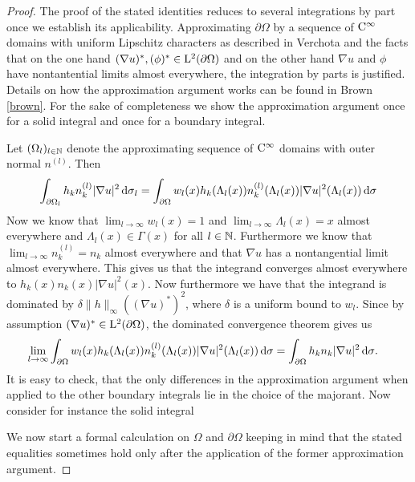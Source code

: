 \begin{proof}
  The proof of the stated identities reduces to several integrations by part  once we establish its applicability. 
  Approximating $\partial \Omega$ by a sequence of $\mathrm{C}^\infty$ domains with uniform Lipschitz characters as described in Verchota \cite{verchotaDiss} and the facts that on the one hand $(\nabla u)^*, (\phi)^* \in \mathrm{L}^2(\partial\Omega)$ and on the other hand $\nabla u$ and $\phi$ have nontantential limits almost everywhere, the integration by parts is justified.
  Details on how the approximation argument works can be found in Brown \ref{brown}.
  For the sake of completeness we show the approximation argument once for a solid integral and once for a boundary integral.

  Let $(\Omega_l)_{l \in \mathbb{N}}$ denote the approximating sequence of $\mathrm{C}^\infty$ domains with outer normal $n^{(l)}$.
  Then
  \begin{align*}
    \int_{\partial\Omega_l} h_k n_k^{(l)} |\nabla u|^2 \, {\operatorname{d}\!{\sigma}}_l
    = \int_{\partial \Omega} w_l(x) h_k(\Lambda_l(x)) n_k^{(l)}(\Lambda_l(x)) |\nabla u|^2(\Lambda_l(x)) \, {\operatorname{d}\!{\sigma}}
  \end{align*}
  Now we know that $\lim_{l \to \infty} w_l(x) = 1$ and $\lim_{l \to \infty} \Lambda_l(x) = x$ almost everywhere and $\Lambda_l(x) \in \Gamma(x)$ for all $l \in \mathbb{N}$.
  Furthermore we know that $\lim_{l \to \infty} n_k^{(l)} = n_k$ almost everywhere and that $\nabla u$ has a nontangential limit almost everywhere.
  This gives us that the integrand converges almost everywhere to $ h_k(x) n_k(x) |\nabla u|^2(x)$.
  Now furthermore we have that the integrand is dominated by $\delta \|h\|_\infty ((\nabla u)^*)^2$, where $\delta$ is a uniform bound to $w_l$. Since by assumption $(\nabla u)^* \in \mathrm{L}^2(\partial\Omega)$, the dominated convergence theorem gives us
  \begin{align*}
    \lim_{l \to \infty} \int_{\partial \Omega} w_l(x) h_k(\Lambda_l(x)) n_k^{(l)}(\Lambda_l(x)) |\nabla u|^2(\Lambda_l(x)) \, {\operatorname{d}\!{\sigma}} 
    &= 
    \int_{\partial\Omega} h_k n_k |\nabla u|^2 \, {\operatorname{d}\!{\sigma}}.
  \end{align*}
  It is easy to check, that the only differences in the approximation argument when applied to the other boundary integrals lie in the choice of the majorant.
  Now consider for instance the solid integral

  We now start a formal calculation on $\Omega$ and $\partial\Omega$ keeping in mind that the stated equalities sometimes hold only after the application of the former approximation argument.


\end{proof}
